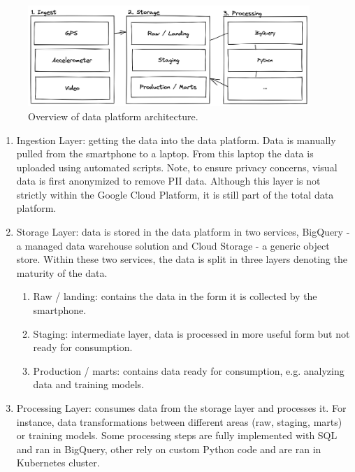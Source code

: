 \begin{figure}[H]
\begin{center}
\includegraphics[width=0.95\textwidth,keepaspectratio]{images/4_data/data-platform.png}
\end{center}
\captionsetup{width=.95\textwidth}
\caption{Overview of data platform architecture.}
\label{fig:data-platform-architecture}
\end{figure}

\begin{enumerate}
\item Ingestion Layer: getting the data into the data platform. Data is manually pulled from the smartphone to a laptop. From this laptop the data is uploaded using automated scripts. Note, to ensure privacy concerns, visual data is first anonymized to remove PII data. Although this layer is not strictly within the Google Cloud Platform, it is still part of the total data platform.
\item Storage Layer: data is stored in the data platform in two services, BigQuery - a managed data warehouse solution and Cloud Storage - a generic object store. Within these two services, the data is split in three layers denoting the maturity of the data.
\begin{enumerate}
\item Raw / landing: contains the data in the form it is collected by the smartphone.
\item Staging: intermediate layer, data is processed in more useful form but not ready for consumption.
\item Production / marts: contains data ready for consumption, e.g. analyzing data and training models.
\end{enumerate}
\item Processing Layer: consumes data from the storage layer and processes it. For instance, data transformations between different areas (raw, staging, marts) or training models. Some processing steps are fully implemented with SQL and ran in BigQuery, other rely on custom Python code and are ran in Kubernetes cluster.
\end{enumerate}

